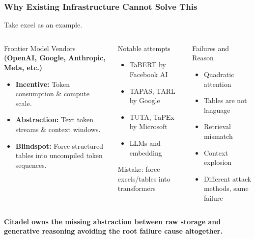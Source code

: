 \documentclass[aspectratio=169,11pt]{beamer}
\begin{document}
	\begin{frame}
		\frametitle{Why Existing Infrastructure Cannot Solve This}
		Take excel as an example.
		\begin{columns}[T]
			\begin{block}{Frontier Model Vendors}
				\textbf{(OpenAI, Google, Anthropic, Meta, etc.)}
				\begin{itemize}\scriptsize
					\item \textbf{Incentive:} Token consumption \& compute scale.
					\item \textbf{Abstraction:} Text token streams \& context windows.
					\item \textbf{Blindspot:} Force structured tables into uncompiled token sequences.
				\end{itemize}
			\end{block}

			\begin{block}{Notable attempts}
				\begin{itemize}\scriptsize
					\item TaBERT by Facebook AI
					\item TAPAS, TARL by Google
					\item TUTA, TaPEx by Microsoft
					\item LLMs and embedding
				\end{itemize}
				Mistake: force excels/tables into transformers
			\end{block}

			\begin{block}{Failures and Reason}
				\begin{itemize}\scriptsize
					\item Quadratic attention
					\item Tables are not language
					\item Retrieval mismatch
					\item Context explosion
					\item Different attack methods, same failure
				\end{itemize}
			\end{block}
		\end{columns}
		\vfill
		\centering
		{\color{CitadelHighlight}\bfseries Citadel owns the missing abstraction between raw storage and generative reasoning avoiding the root failure cause altogether.}
	\end{frame}
\end{document}
